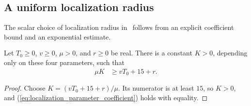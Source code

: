 \subsection{A uniform localization radius}
\label{sec:localization_parameters}


The scalar choice of localization radius
in~\cite{OpenAI2026PolynomialPEPS} follows from an explicit coefficient
bound and an exponential estimate.

\begin{theorem}
    \label{thm:localization_parameter_constant}
    \leanok
    Let $T_0\ge0$, $v\ge0$, $\mu>0$, and $r\ge0$ be real. There is a
    constant $K>0$, depending only on these four parameters, such that
    \begin{align}
        \mu K&\ge vT_0+15+r.
        \label{eq:localization_parameter_coefficient}
    \end{align}
\end{theorem}
\begin{proof}
    \leanok
    Choose $K=(vT_0+15+r)/\mu$. Its numerator is at least $15$, so
    $K>0$, and (\ref{eq:localization_parameter_coefficient}) holds
    with equality.
\end{proof}

